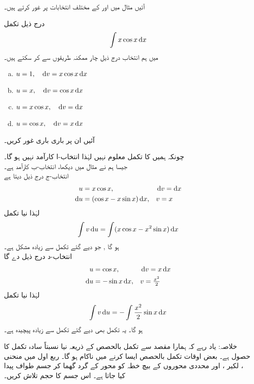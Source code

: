 آئیں مثال  میں  اور  کے مختلف انتخابات پر غور کرتے ہیں۔  

درج ذیل تکمل
\begin{align*}
\int x\cos x\dif x
\end{align*}
میں ہم  انتخاب درج ذیل چار ممکنہ طریقوں سے کر سکتے ہیں۔ 
\begin{enumerate}[a.]
\item
$u=1,\quad \dif v=x\cos x\dif x$
\item
$u=x,\quad \dif v=\cos x\dif x$
\item
$u=x\cos x,\quad \dif v=\dif x$
\item
$u=\cos x,\quad \dif v=x\dif x$
\end{enumerate}
آئیں ان پر باری باری غور کریں۔

چونکہ ہمیں  کا تکمل معلوم نہیں  لہٰذا انتخاب-ا کارآمد نہیں ہو گا۔\\
جیسا ہم نے مثال  میں دیکھا، انتخاب-ب کارآمد ہے۔\\
انتخاب-ج درج ذیل دیتا ہے
\begin{align*}
u&=x\cos x,&&\dif v=\dif x\\
\dif u&=(\cos x-x\sin x)\dif x,&&v=x
\end{align*}
لہٰذا نیا تکمل
\begin{align*}
\int v\dif u=\int(x\cos x-x^2\sin x)\dif x
\end{align*}
ہو گا , جو دیے گئے تکمل سے زیادہ مشکل ہے۔\\
انتخاب-د درج ذیل دے گا
\begin{align*}
u&=\cos x,&&\dif v=x\dif x\\
\dif u&=-\sin x\dif x,&&v=\tfrac{x^2}{2}
\end{align*}
لہٰذا نیا تکمل
\begin{align*}
\int v\dif u=-\int\frac{x^2}{2}\sin x\dif x
\end{align*}
ہو گا۔ یہ تکمل بھی دیے گئے تکمل سے زیادہ پیچیدہ ہے۔

خلاصہ: یاد رہے کہ ہمارا مقصد  سے تکمل بالحصص کے ذریعہ  نیا نسبتاً سادہ تکمل کا حصول ہے۔ بعض اوقات تکمل بالحصص  ایسا کرنے میں ناکام ہو گا۔ 
ربع اول میں منحنی ، لکیر ،  اور محددی محوروں کے بیچ خطہ کو محور  کے گرد گھما کر جسم طواف پیدا کیا جاتا ہے۔ اس جسم کا حجم تلاش کریں۔

